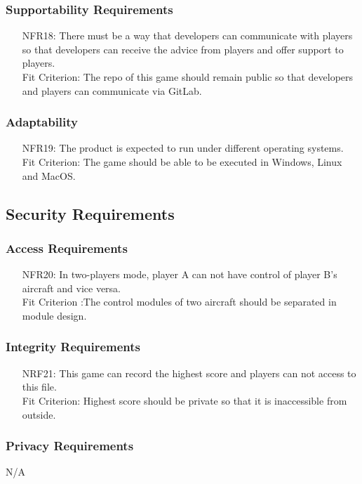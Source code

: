 \documentclass[12pt]{article}
\begin{document}
\subsubsection{Supportability Requirements}
\begin{itemize}
\item[NFR18:] There must be a way that developers can 
communicate with players so that developers can receive the
advice from players and offer support to players.\\Fit Criterion: The repo of this game should remain public so that
developers and players can communicate via GitLab.
\end{itemize}
\subsubsection{Adaptability}
\begin{enumerate}
\item[NFR19:] The product is expected to run under 
different operating systems. \\ Fit Criterion: The game should
be able to be executed in Windows, Linux and MacOS.
\end{enumerate}
\subsection{Security Requirements}
\subsubsection{Access Requirements}
\begin{itemize}
\item[NFR20:] In two-players mode, player A can not have
control of player B's aircraft and vice versa.\\Fit Criterion
:The control modules of two aircraft should be separated in
module design.
\end{itemize}
\subsubsection{Integrity Requirements}
\begin{itemize}
\item[NRF21:]This game can record the highest score and 
players can not access to this file.\\Fit Criterion: Highest
score should be private so that it is inaccessible from outside.
\end{itemize}
\subsubsection{Privacy Requirements}
N/A
\end{document}
